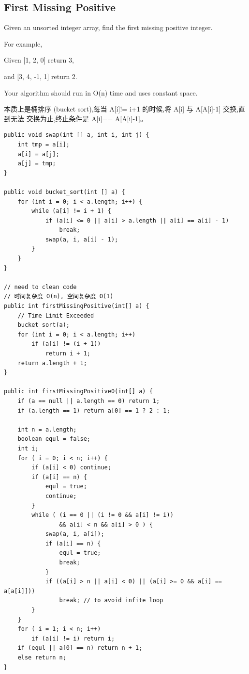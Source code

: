 \documentclass[12pt]{book}
\begin{document}
\subsection{First Missing Positive}
\label{sec-7-3-3}
Given an unsorted integer array, find the first missing positive integer.

For example,

Given [1, 2, 0] return 3, 

and [3, 4, -1, 1] return 2.

Your algorithm should run in O(n) time and uses constant space.

本质上是桶排序 (bucket sort),每当 A[i]!= i+1 的时候,将 A[i] 与 A[A[i]-1] 交换,直到无法
交换为止,终止条件是 A[i]== A[A[i]-1]。

\lstset{language=java,label= ,caption= ,numbers=none}
\begin{lstlisting}
public void swap(int [] a, int i, int j) {        
    int tmp = a[i];
    a[i] = a[j];
    a[j] = tmp;
}

public void bucket_sort(int [] a) {
    for (int i = 0; i < a.length; i++) {
        while (a[i] != i + 1) {
            if (a[i] <= 0 || a[i] > a.length || a[i] == a[i] - 1)
                break;
            swap(a, i, a[i] - 1);
        }
    }
}

// need to clean code
// 时间复杂度 O(n), 空间复杂度 O(1)
public int firstMissingPositive(int[] a) {
    // Time Limit Exceeded
    bucket_sort(a);
    for (int i = 0; i < a.length; i++) 
        if (a[i] != (i + 1))
            return i + 1;
    return a.length + 1;
}

public int firstMissingPositive0(int[] a) {
    if (a == null || a.length == 0) return 1;
    if (a.length == 1) return a[0] == 1 ? 2 : 1;

    int n = a.length;
    boolean equl = false;
    int i;
    for ( i = 0; i < n; i++) {
        if (a[i] < 0) continue;
        if (a[i] == n) {
            equl = true;
            continue;
        }
        while ( (i == 0 || (i != 0 && a[i] != i))
                && a[i] < n && a[i] > 0 ) {
            swap(a, i, a[i]);
            if (a[i] == n) {
                equl = true;
                break;
            }
            if ((a[i] > n || a[i] < 0) || (a[i] >= 0 && a[i] == a[a[i]]))
                break; // to avoid infite loop
        }
    }
    for ( i = 1; i < n; i++) 
        if (a[i] != i) return i;
    if (equl || a[0] == n) return n + 1;
    else return n;
}
\end{lstlisting}
\end{document}
